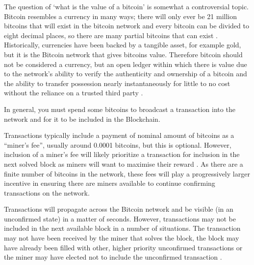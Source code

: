 \documentclass{article}
\begin{document}
The question of `what is the value of a bitcoin' is somewhat a controversial topic. Bitcoin resembles a currency in many ways; there will only ever be 21 million bitcoins that will exist in the bitcoin network and every bitcoin can be divided to eight decimal places, so there are many partial bitcoins that can exist \citep{8_itbit_2015}. Historically, currencies have been backed by a tangible asset, for example gold, but it is the Bitcoin network that gives bitcoins value. Therefore bitcoin should not be considered a currency, but an open ledger within which there is value due to the network’s ability to verify the authenticity and ownership of a bitcoin and the ability to transfer possession nearly instantaneously for little to no cost without the reliance on a trusted third party \citep{9_kaye_scholer_2016}.

In general, you must spend some bitcoins to broadcast a transaction into the network and for it to be included in the Blockchain. 

Transactions typically include a payment of nominal amount of bitcoins as a ``miner’s fee'', usually around 0.0001 bitcoins, but this is optional. However, inclusion of a miner’s fee will likely prioritize a transaction for inclusion in the next solved block as miners will want to maximise their reward \citep{9_kaye_scholer_2016}. As there are a finite number of bitcoins in the network, these fees will play a progressively larger incentive in ensuring there are miners available to continue confirming transactions on the network.

Transactions will propagate across the Bitcoin network and be visible (in an unconfirmed state) in a matter of seconds. However, transactions may not be included in the next available block in a number of situations. The transaction may not have been received by the miner that solves the block, the block may have already been filled with other, higher priority unconfirmed transactions or the miner may have elected not to include the unconfirmed transaction \citep{9_kaye_scholer_2016}.

\end{document}

